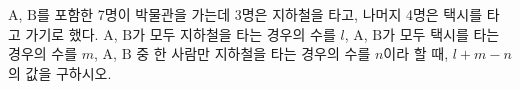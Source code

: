 \hspace*{2mm}\begin{minipage}[t]{\dimexpr\linewidth-2mm\relax}\vspace{0pt}
$\mathrm{A}$, $\mathrm{B}$를 포함한 7명이 박물관을 가는데 3명은 지하철을 타고, 나머지 4명은 택시를 타고 가기로 했다. $\mathrm{A}$, $\mathrm{B}$가 모두 지하철을 타는 경우의 수를 $l$, $\mathrm{A}$, $\mathrm{B}$가 모두 택시를 타는 경우의 수를 $m$, $\mathrm{A}$, $\mathrm{B}$ 중 한 사람만 지하철을 타는 경우의 수를 $n$이라 할 때, $l+m-n$의 값을 구하시오.\end{minipage}
